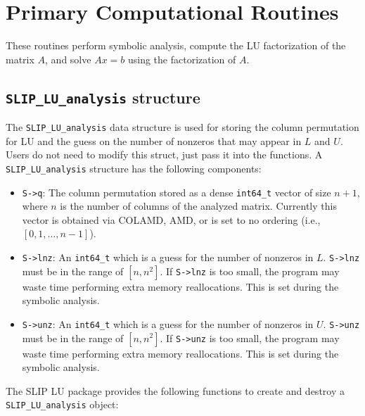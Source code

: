 \documentclass[12pt]{article}
\theoremstyle{definition}
\begin{document}
\section{Primary Computational Routines}
\label{s:primary}

These routines perform symbolic analysis, compute the LU factorization of the
matrix $A$, and solve $Ax=b$ using the factorization of $A$.

\cprotect\subsection{\verb|SLIP_LU_analysis| structure}
\label{ss:SLIP_LU_analysis}

The \verb|SLIP_LU_analysis| data structure is used for storing the column
permutation for LU and the guess on the number of nonzeros that may appear in
$L$ and $U$. Users do not need to modify this struct, just pass it into the
functions. A \verb|SLIP_LU_analysis| structure has the following components:

\begin{itemize}
\item \verb|S->q|: The column permutation stored as a dense \verb|int64_t|
vector of size $n+1$, where $n$ is the number of columns of the analyzed matrix.
Currently this vector is obtained via COLAMD, AMD, or is set to no ordering
(i.e., $[0, 1, \hdots, n-1]$).

\item \verb|S->lnz|: An \verb|int64_t| which is a guess for the number of
nonzeros in $L$. \verb|S->lnz| must be in the range of $[n, n^2]$. If
\verb|S->lnz| is too small, the program may waste time performing extra memory
reallocations. This is set during the symbolic analysis.

\item \verb|S->unz|: An \verb|int64_t| which is a guess for the number of
nonzeros in $U$. \verb|S->unz| must be in the range of $[n, n^2]$. If
\verb|S->unz| is too small, the program may waste time performing extra memory
reallocations. This is set during the symbolic analysis.
\end{itemize}

The SLIP LU package provides the following functions to create and destroy a
\verb|SLIP_LU_analysis| object:
\end{document}
